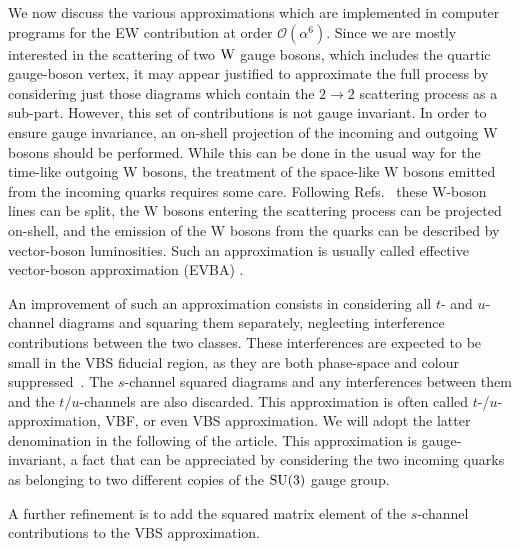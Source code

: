 We now discuss the various approximations which are implemented in computer programs for the EW contribution at order $\mathcal{O}{\left(\alpha^{6}\right)}$.
Since we are mostly interested in 
the scattering of two $\text{W}$ gauge bosons, which includes the quartic gauge-boson vertex, it may appear justified to approximate the 
full process by considering just those diagrams which contain the $2\rightarrow 2$ scattering process as a sub-part.
However, this set of contributions is not gauge invariant.
In order to ensure gauge invariance, an on-shell projection of
the incoming and outgoing W bosons should be performed.
While this can be done in the usual way for the time-like
outgoing W bosons, the treatment of the space-like W bosons
emitted from the incoming quarks requires some care.
Following Refs.~\cite{Kuss:1995yv,Accomando:2006hq} these W-boson lines can be split,
the W bosons entering the scattering process can be projected
on-shell, and the emission of the W bosons from the quarks can be
described by vector-boson luminosities.
Such an approximation is usually called effective vector-boson
approximation (EVBA) \cite{Dawson:1984gx,Duncan:1985vj,Cahn:1983ip}.

An improvement of such an approximation consists 
in considering all $t$- and $u$-channel diagrams and squaring them separately, neglecting interference contributions between the two classes.
These interferences are expected to be small in the VBS fiducial region, as they are both phase-space and colour suppressed~\cite{Oleari:2003tc,Denner:2012dz}.
The $s$-channel squared diagrams and any interferences between them and the  $t/u$-channels are also discarded.
This approximation is often called $t$-/$u$- approximation, VBF, or even VBS approximation.
We will adopt the latter denomination in the following of the article.
This approximation is gauge-invariant, a fact that can be appreciated by considering the two incoming quarks as belonging to two different copies of the $\rm{SU}(3)$ gauge group.

A further refinement is to add the squared matrix element of the $s$-channel contributions to the VBS approximation.

